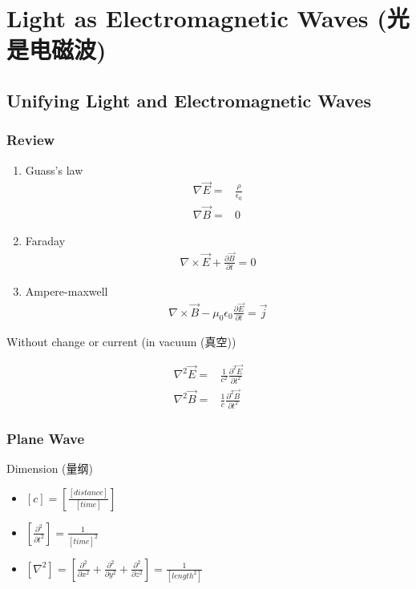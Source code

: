 \newpage
\section[Light as Electromagnetic Waves]{Light as Electromagnetic Waves (光是电磁波)}

\subsection{Unifying Light and Electromagnetic Waves}

\subsubsection{Review}

\begin{enumerate}
    \item Guass's law
    \begin{align*}
        \nabla \vec{E }=&\frac{\rho}{\epsilon_0}\\
        \nabla \vec{B}=&0
    \end{align*}
    \item Faraday
    \begin{align*}
        \nabla \times \vec{E}+\frac{\partial \vec{B }}{\partial t}=0
    \end{align*}
    \item Ampere-maxwell
    \begin{align*}
        \nabla \times \vec{B }-\mu_0 \epsilon_0\frac{\partial\vec{E }}{\partial t}=\vec{j}
    \end{align*}
\end{enumerate}

Without change or current (in vacuum (真空))

\begin{align*}
    \nabla^2 \vec{E}=&\frac{1}{c^2}\frac{\partial^2\vec{E}}{\partial t^2}\\
    \nabla^2\vec{B}=&\frac{1}{c }\frac{\partial^2\vec{B }}{\partial t^2}
\end{align*}

\subsubsection{Plane Wave}

Dimension (量纲)
\begin{itemize}
    \item $[c]=[\frac{[distance]}{[time]}]$
    \item $[\frac{\partial ^2}{\partial t^2}]=\frac{1}{[time]^2}$
    \item $[\nabla^2]=[\frac{\partial ^2}{\partial x^2}+\frac{\partial ^2}{\partial y^2}+\frac{\partial ^2}{\partial z^2}]=\frac{1}{[length^2]}$
\end{itemize}

